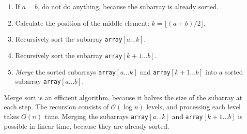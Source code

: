 \documentclass[twoside,12pt,a4paper,english]{book}
\theoremstyle{definition}
\theoremstyle{problemstyle}
\theoremstyle{problemstyle}
\theoremstyle{problemstyle}
\begin{document}
\begin{enumerate}
\item If $a=b$, do not do anything, because the subarray is already sorted.
\item Calculate the position of the middle element: $k=\lfloor (a+b)/2 \rfloor$.
\item Recursively sort the subarray \texttt{array}$[a \ldots k]$.
\item Recursively sort the subarray \texttt{array}$[k+1 \ldots b]$.
\item \emph{Merge} the sorted subarrays \texttt{array}$[a \ldots k]$ and
\texttt{array}$[k+1 \ldots b]$
into a sorted subarray \texttt{array}$[a \ldots b]$.
\end{enumerate}

Merge sort is an efficient algorithm, because it
halves the size of the subarray at each step.
The recursion consists of $\mathcal{O}(\log n)$ levels,
and processing each level takes $O(n)$ time.
Merging the subarrays \texttt{array}$[a \ldots k]$ and \texttt{array}$[k+1 \ldots b]$
is possible in linear time, because they are already sorted.
\end{document}

